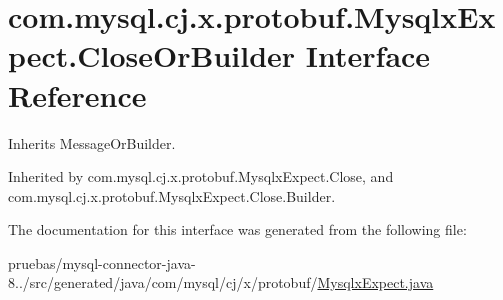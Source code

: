 \hypertarget{interfacecom_1_1mysql_1_1cj_1_1x_1_1protobuf_1_1_mysqlx_expect_1_1_close_or_builder}{}\section{com.\+mysql.\+cj.\+x.\+protobuf.\+Mysqlx\+Expect.\+Close\+Or\+Builder Interface Reference}
\label{interfacecom_1_1mysql_1_1cj_1_1x_1_1protobuf_1_1_mysqlx_expect_1_1_close_or_builder}


Inherits Message\+Or\+Builder.



Inherited by com.\+mysql.\+cj.\+x.\+protobuf.\+Mysqlx\+Expect.\+Close, and com.\+mysql.\+cj.\+x.\+protobuf.\+Mysqlx\+Expect.\+Close.\+Builder.



The documentation for this interface was generated from the following file\+:\begin{DoxyCompactItemize}
\item 
pruebas/mysql-\/connector-\/java-\/8../src/generated/java/com/mysql/cj/x/protobuf/\mbox{\hyperlink{_mysqlx_expect_8java}{Mysqlx\+Expect.\+java}}\end{DoxyCompactItemize}
